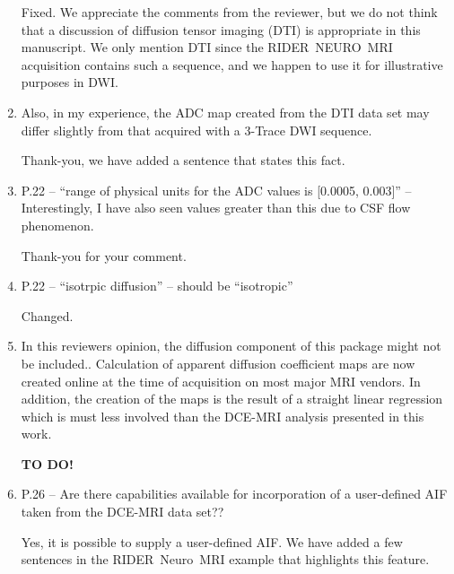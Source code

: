 \documentclass[11pt]{article}
\begin{document}
\begin{enumerate}
  Fixed.  We appreciate the comments from the reviewer, but we do not
  think that a discussion of diffusion tensor imaging (DTI) is
  appropriate in this manuscript.  We only mention DTI since the
  RIDER~NEURO~MRI acquisition contains such a sequence, and we happen
  to use it for illustrative purposes in DWI.

\item Also, in my experience, the ADC map created from the DTI data
  set may differ slightly from that acquired with a 3-Trace DWI
  sequence.

  Thank-you, we have added a sentence that states this fact.

\item P.22 – ``range of physical units for the ADC values is [0.0005,
  0.003]'' – Interestingly, I have also seen values greater than this
  due to CSF flow phenomenon.

  Thank-you for your comment.

\item P.22 – ``isotrpic diffusion'' – should be ``isotropic''

  Changed.

\item In this reviewers opinion, the diffusion component of this
  package might not be included..  Calculation of apparent diffusion
  coefficient maps are now created online at the time of acquisition
  on most major MRI vendors.  In addition, the creation of the maps is
  the result of a straight linear regression which is must less
  involved than the DCE-MRI analysis presented in this work.

  \textbf{TO DO!}  

\item P.26 – Are there capabilities available for incorporation of a
  user-defined AIF taken from the DCE-MRI data set??

  Yes, it is possible to supply a user-defined AIF.  We have added a
  few sentences in the RIDER~Neuro~MRI example that highlights this
  feature.

\end{enumerate}




\end{document}
